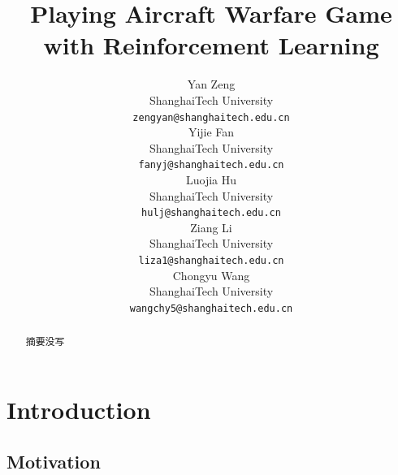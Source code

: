 \documentclass{article}
\title{Playing Aircraft Warfare Game with Reinforcement Learning}
\author{
    Yan Zeng\\
    ShanghaiTech University\\
    \texttt{zengyan@shanghaitech.edu.cn}\\
    \AND
    Yijie Fan\\
    ShanghaiTech University\\
    \texttt{fanyj@shanghaitech.edu.cn}\\
    \AND
    Luojia Hu\\
    ShanghaiTech University\\
    \texttt{hulj@shanghaitech.edu.cn}\\
    \AND
    Ziang Li\\
    ShanghaiTech University\\
    \texttt{liza1@shanghaitech.edu.cn}\\
    \AND
    Chongyu Wang\\
    ShanghaiTech University\\
    \texttt{wangchy5@shanghaitech.edu.cn}\\    
}
\begin{document}
\maketitle

\begin{abstract}
    摘要没写
\end{abstract}


\section{Introduction}

    \subsection{Motivation}

\end{document}
